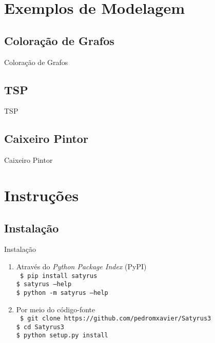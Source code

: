 \documentclass[brazil, MathSerif, aspectratio = 169]{beamer}
\begin{document}
    \section{Exemplos de Modelagem}
    \SectionPage

    \subsection{Coloração de Grafos}
    \begin{frame}{Coloração de Grafos}

    \end{frame}

    \subsection{TSP}
    \begin{frame}{TSP}
        
    \end{frame}

    \subsection{Caixeiro Pintor}
    \begin{frame}{Caixeiro Pintor}
        
    \end{frame}

    \section{Instruções}

    \subsection{Instalação}
    \begin{frame}%
        {Instalação}

        \begin{enumerate}
            \item Através do \textit{Python Package Index} (PyPI)\\%
            \texttt{%
                \$ pip install satyrus\\%
                \$ satyrus --help\\%
                \$ python -m satyrus --help
            }
            \item Por meio do código-fonte\\%
            \texttt{%
                \$ git clone https://github.com/pedromxavier/Satyrus3\\%
                \$ cd Satyrus3\\%
                \$ python setup.py install
            }
        \end{enumerate}
    \end{frame}
\end{document}

